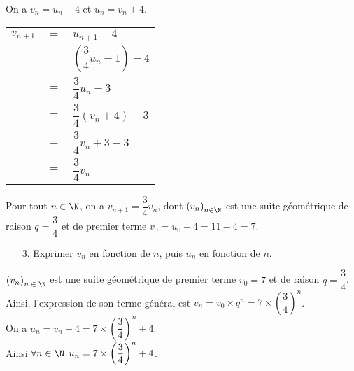 \vspace*{.3cm}

On a $v_n = u_n - 4$ et $u_n = v_n + 4$. \\

\begin{tabular}{lll}
$v_{n+1}$ & $=$ & $u_{n+1} - 4$ \vspace*{.3cm} \\
& $=$ & $\left(\dfrac{3}{4}u_n + 1\right) - 4$ \vspace*{.3cm} \\
& $=$ & $\dfrac{3}{4}u_n - 3$ \vspace*{.3cm}
\\
& $=$ & $\dfrac{3}{4}\left(v_n + 4\right) - 3$ \vspace*{.3cm} \\
& $=$ & $\dfrac{3}{4}v_n + 3 - 3$ \vspace*{.3cm} \\
& $=$ & $\dfrac{3}{4}v_n$ \vspace*{.3cm} \\
\end{tabular}

\vspace*{.3cm}

Pour tout $n \in \N$, on a $v_{n+1} = \dfrac{3}{4}v_n$, dont $\left(v_n\right)_{n \in \N}$ est une suite géométrique de raison $q = \dfrac{3}{4}$ et de premier terme $v_0 = u_0 - 4 = 11 - 4 = 7$. \\

\begin{itemize}
\item[3.] Exprimer $v_n$ en fonction de $n$, puis $u_n$ en fonction de $n$. \\
\end{itemize}

$\left(v_n\right)_{n \; \in \; \N}$ est une suite géométrique de premier terme $v_0 =7$ et de raison $q =\dfrac{3}{4}$. \\

Ainsi, l'expression de son terme général est $v_n = v_0 \times q^n = 7 \times \left(\dfrac{3}{4}\right)^n$. \\

On a $u_n = v_n + 4 = 7 \times \left(\dfrac{3}{4}\right)^n + 4$. \\

Ainsi $\forall n \in \N, u_n = 7 \times \left(\dfrac{3}{4}\right)^n + 4$. 

\vspace*{-5cm}

